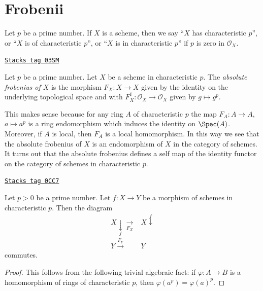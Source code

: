 \section{Frobenii}
\label{varieties-section-frobenius}
Let $p$ be a prime number. If $X$ is a scheme, then we say
``$X$ has characteristic $p$'', or ``$X$ is of characteristic $p$'',
or ``$X$ is in characteristic $p$'' if $p$ is zero in $\mathcal{O}_X$.

\begin{definition}
\label{varieties-definition-absolute-frobenius}
\href{https://stacks.math.columbia.edu/tag/03SM}{\texttt{Stacks tag 03SM}}

Let $p$ be a prime number. Let $X$ be a scheme in characteristic $p$.
The {\it absolute frobenius of $X$} is the morphism $F_X : X \to X$
given by the identity on the underlying topological space and
with $F_X^\sharp : \mathcal{O}_X \to \mathcal{O}_X$ given by $g \mapsto g^p$.
\end{definition}

This makes sense because for any ring $A$ of characteristic $p$
the map $F_A : A \to A$, $a \mapsto a^p$ is a ring endomorphism
which induces the identity on $\Spec(A)$. Moreover, if $A$ is
local, then $F_A$ is a local homomorphism. In this way we see that
the absolute frobenius of $X$ is an endomorphism of $X$
in the category of schemes. It turns out that the absolute frobenius
defines a self map of the identity functor on the category
of schemes in characteristic $p$.

\begin{lemma}
\label{varieties-lemma-frobenius-endomorphism-identity}
\href{https://stacks.math.columbia.edu/tag/0CC7}{\texttt{Stacks tag 0CC7}}

Let $p > 0$ be a prime number.
Let $f : X \to Y$ be a morphism of schemes in characteristic $p$.
Then the diagram
$$
\begin{array}{cc}X \underset{f}{\downarrow}\underset{F_X}{\longrightarrow} & X \overset{f}{\downarrow} \\ Y \overset{F_Y}{\longrightarrow} & Y\end{array}
$$
commutes.
\end{lemma}

\begin{proof}
This follows from the following trivial algebraic fact: if $\varphi : A \to B$
is a homomorphism of rings of characteristic $p$, then
$\varphi(a^p) = \varphi(a)^p$.
\end{proof}

